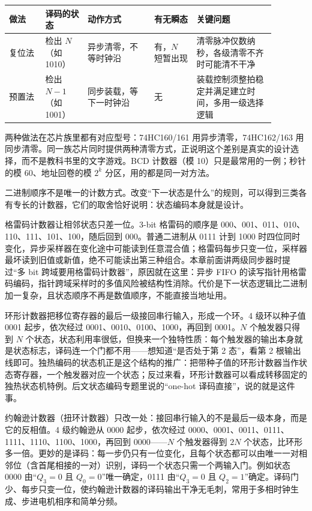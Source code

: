 \begin{longtable}{L{0.12\linewidth}L{0.14\linewidth}L{0.22\linewidth}L{0.14\linewidth}L{0.26\linewidth}}
\toprule
做法 & 译码的状态 & 动作方式 & 有无瞬态 & 关键问题 \\
\midrule
复位法 & 检出 $N$（如 1010） & 异步清零，不等时钟沿 & 有，$N$ 短暂出现 & 清零脉冲仅数纳秒，各级清零不齐时可能清不干净 \\
预置法 & 检出 $N-1$（如 1001） & 同步装载，等下一时钟沿 & 无 & 装载控制须整拍稳定并满足建立时间，多用一级选择逻辑 \\
\bottomrule
\end{longtable}

两种做法在芯片族里都有对应型号：74HC160/161 用异步清零，74HC162/163 用同步清零。同一族芯片同时提供两种清零方式，正说明这个差别是真实的设计选择，而不是教科书里的文字游戏。BCD 计数器（模 10）只是最常用的一例；秒针的模 60、地址回卷的模 $2^k$ 分区，用的都是同一对方法。


二进制顺序不是唯一的计数方式。改变“下一状态是什么”的规则，可以得到三类各有专长的计数器，它们的取舍恰好说明：状态编码本身就是设计。

格雷码计数器让相邻状态只差一位。3-bit 格雷码的顺序是 000、001、011、010、110、111、101、100，随后回到 000。普通二进制从 0111 计到 1000 时四位同时变化，异步采样器在变化途中可能读到任意混合值；格雷码每步只变一位，采样器最坏读到旧值或新值，绝不可能读出第三种组合。本章前面讲两级同步器时提过“多 bit 跨域要用格雷码计数器”，原因就在这里：异步 FIFO 的读写指针用格雷码编码，指针跨域采样时的多值风险被结构性消除。代价是下一状态逻辑比二进制加一复杂，且状态顺序不再是数值顺序，不能直接当地址用。

环形计数器把移位寄存器的最后一级接回串行输入，形成一个环。4 级环以种子值 0001 起步，依次经过 0001、0010、0100、1000，再回到 0001。$N$ 个触发器只得到 $N$ 个状态，状态利用率很低，但换来一个独特性质：每个触发器的输出本身就是状态标志，译码连一个门都不用——想知道“是否处于第 2 态”，看第 2 根输出线即可。独热编码的状态机正是这个结构的推广：把带种子值的环形计数器当作状态寄存器，一个触发器对应一个状态；反过来看，环形计数器可以看成转移固定的独热状态机特例。后文状态编码专题里说的“one-hot 译码直接”，说的就是这件事。

约翰逊计数器（扭环计数器）只改一处：接回串行输入的不是最后一级本身，而是它的反相值。4 级约翰逊从 0000 起步，依次经过 0000、0001、0011、0111、1111、1110、1100、1000，再回到 0000——$N$ 个触发器得到 $2N$ 个状态，比环形多一倍。更妙的是译码：每一步仍只有一位变化，且每个状态都可以由唯一一对相邻位（含首尾相接的一对）识别，译码一个状态只需一个两输入门。例如状态 0000 由“$Q_3=0$ 且 $Q_0=0$”唯一确定，0111 由“$Q_3=0$ 且 $Q_2=1$”确定。译码门少、每步只变一位，使约翰逊计数器的译码输出干净无毛刺，常用于多相时钟生成、步进电机相序和简单分频。

